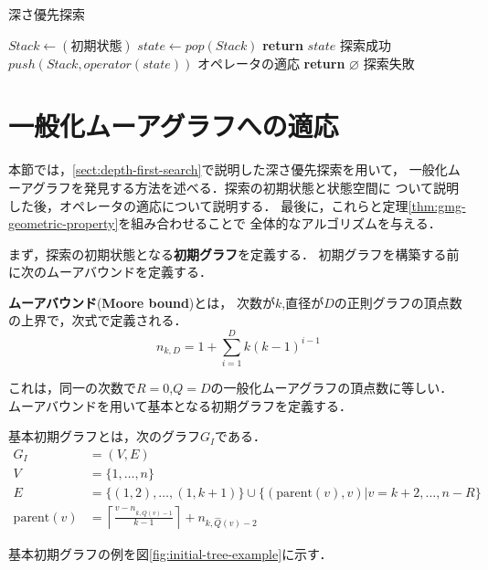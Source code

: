 \begin{algorithm}[H]
  \caption{深さ優先探索}
  \label{algo:depth-first-search}
  \begin{algorithmic}[1]
    \State $Stack\gets(初期状態)$
    \State $state\gets pop(Stack)$
    \State \textbf{return} $state$
    \Comment 探索成功
    \EndIf
    \State $push(Stack, operator(state))$
    \Comment オペレータの適応
    \EndFor
    \EndWhile
    \State \textbf{return} $\varnothing$
    \Comment 探索失敗
    \EndProcedure
  \end{algorithmic}
\end{algorithm}

\section{一般化ムーアグラフへの適応}
\label{sect:apply-to-gmg}
本節では，\ref{sect:depth-first-search}で説明した深さ優先探索を用いて，
一般化ムーアグラフを発見する方法を述べる．探索の初期状態と状態空間に
ついて説明した後，オペレータの適応について説明する．
最後に，これらと定理\ref{thm:gmg-geometric-property}を組み合わせることで
全体的なアルゴリズムを与える．

まず，探索の初期状態となる\textbf{初期グラフ}を定義する．
初期グラフを構築する前に次のムーアバウンドを定義する．
\begin{definition}
  \textbf{ムーアバウンド}(\textbf{Moore bound})とは，
  次数が$k$,直径が$D$の正則グラフの頂点数の上界で，次式で定義される．
  \begin{equation}
    n_{k,D} = 1 + \sum_{i=1}^Dk(k-1)^{i-1}
  \end{equation}
\end{definition}
これは，同一の次数で$R=0$,$Q=D$の一般化ムーアグラフの頂点数に等しい．
ムーアバウンドを用いて基本となる初期グラフを定義する．
\begin{definition}
  \label{def:basic-initial-graph}
  基本初期グラフとは，次のグラフ$G_I$である．
  \begin{equation}
    \begin{aligned}
      \label{eq:basic-initial-graph}
      G_I&=(V,E) \\
      V&=\{1,\ldots,n\} \\
      E&=\{(1,2),\ldots,(1,k+1)\}\cup
      \{(\text{parent}(v),v)|v=k+2,\ldots,n-R\} \\
      \text{parent}(v)&=
      \left\lceil\frac{v-n_{k,\hat{Q}(v)-1}}{k-1}\right\rceil+n_{k,\hat{Q}(v)-2}
    \end{aligned}
  \end{equation}
\end{definition}
基本初期グラフの例を図\ref{fig:initial-tree-example}に示す．

